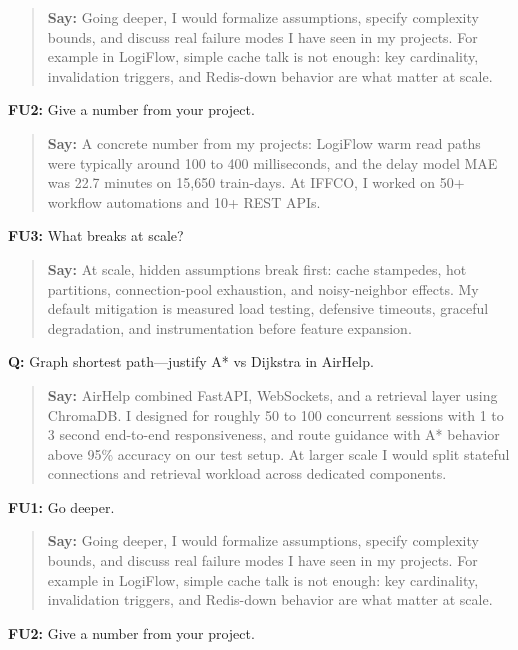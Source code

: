 \documentclass[9pt,a4paper]{article}
\begin{document}
\begin{quote}\small\textbf{Say:} Going deeper, I would formalize assumptions, specify complexity bounds, and discuss real failure modes I have seen in my projects. For example in LogiFlow, simple cache talk is not enough: key cardinality, invalidation triggers, and Redis-down behavior are what matter at scale.\end{quote}
\vspace{2mm}
\textbf{FU2:} Give a number from your project.

\begin{quote}\small\textbf{Say:} A concrete number from my projects: LogiFlow warm read paths were typically around 100 to 400 milliseconds, and the delay model MAE was 22.7 minutes on 15,650 train-days. At IFFCO, I worked on 50+ workflow automations and 10+ REST APIs.\end{quote}
\vspace{2mm}
\textbf{FU3:} What breaks at scale?

\begin{quote}\small\textbf{Say:} At scale, hidden assumptions break first: cache stampedes, hot partitions, connection-pool exhaustion, and noisy-neighbor effects. My default mitigation is measured load testing, defensive timeouts, graceful degradation, and instrumentation before feature expansion.\end{quote}
\vspace{2mm}
\textbf{Q:} Graph shortest path---justify A* vs Dijkstra in AirHelp.

\begin{quote}\small\textbf{Say:} AirHelp combined FastAPI, WebSockets, and a retrieval layer using ChromaDB. I designed for roughly 50 to 100 concurrent sessions with 1 to 3 second end-to-end responsiveness, and route guidance with A* behavior above 95\% accuracy on our test setup. At larger scale I would split stateful connections and retrieval workload across dedicated components.\end{quote}
\vspace{2mm}
\textbf{FU1:} Go deeper.

\begin{quote}\small\textbf{Say:} Going deeper, I would formalize assumptions, specify complexity bounds, and discuss real failure modes I have seen in my projects. For example in LogiFlow, simple cache talk is not enough: key cardinality, invalidation triggers, and Redis-down behavior are what matter at scale.\end{quote}
\vspace{2mm}
\textbf{FU2:} Give a number from your project.
\end{document}
